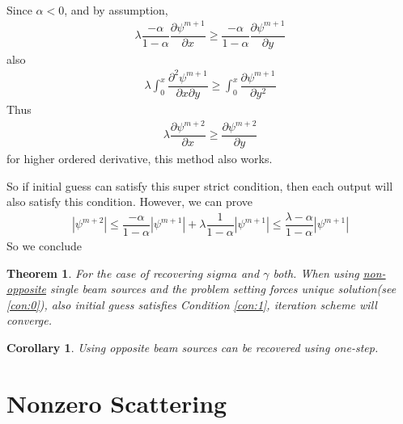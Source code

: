 \documentclass[12pt,a4paper]{article}
\newtheorem{Thm}{Theorem}
\newtheorem{Col}{Corollary}
\begin{document}
\begin{itemize}
\begin{eqnarray}
\end{eqnarray}
Since $\alpha <0$, and by assumption,
\begin{eqnarray}
\lambda\dfrac{-\alpha}{1-\alpha}\dfrac{\partial \psi^{m+1}}{\partial x} \ge  \dfrac{-\alpha}{1-\alpha}\dfrac{\partial \psi^{m+1}}{\partial y}
\end{eqnarray}
also
\begin{eqnarray}
\lambda\int_0^x \dfrac{\partial^2 \psi^{m+1}}{\partial x\partial y}\ge  \int_0^x \dfrac{\partial \psi^{m+1}}{\partial y^2}
\end{eqnarray}
Thus 
\begin{eqnarray}
\lambda\dfrac{\partial \psi^{m+2}}{\partial x} \ge  \dfrac{\partial \psi^{m+2}}{\partial y}
\end{eqnarray}
for higher ordered derivative, this method also works.
\end{itemize}
So if initial guess can satisfy this super strict condition, then each output will also satisfy this condition. However, we can prove
\begin{eqnarray}
|\psi^{m+2}| \le \dfrac{-\alpha}{1-\alpha}|\psi^{m+1}| + \lambda\dfrac{1}{1-\alpha}|\psi^{m+1}| \le \dfrac{\lambda - \alpha}{1 - \alpha} |\psi^{m+1}|
\end{eqnarray}
So we conclude 
\begin{Thm}
For the case of recovering $sigma$ and $\gamma$ both.
When using \underline{non-opposite} single beam sources and the problem setting forces unique solution(see \ref{con:0}), also initial guess satisfies Condition \ref{con:1}, iteration scheme will converge.
\end{Thm}
\begin{Col}
Using opposite beam sources can be recovered using one-step.
\end{Col}
\section{Nonzero Scattering}
\end{document}
